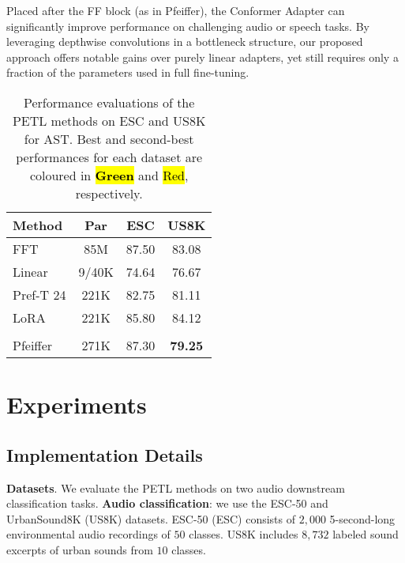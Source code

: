 \documentclass[11pt]{article}
\begin{document}
Placed after the FF block (as in Pfeiffer), the Conformer Adapter can significantly improve performance on challenging audio or speech tasks. By leveraging depthwise convolutions in a bottleneck structure, our proposed approach offers notable gains over purely linear adapters, yet still requires only a fraction of the parameters used in full fine-tuning.


\begingroup
\setlength{\tabcolsep}{3.3pt}

\begin{table}[t]
\centering
\caption{Performance evaluations of the PETL methods on ESC and US8K for AST. 
Best and second-best performances for each dataset are coloured in 
\hl{\textbf{Green}} and 
\hl{Red}, respectively.}
\label{tab:main}
\begin{tabular}{lKKK}
\toprule
\textbf{Method} & \textbf{Par} & \textbf{ESC} & \textbf{US8K}\\
\midrule
FFT &  85M & 87.50 & 83.08\\
Linear     & 9/40K   & 74.64      & 76.67\\
\hline \addlinespace
Pref-T 24  & 221K    & 82.75      & 81.11\\ 
LoRA       & 221K    & 85.80      & 84.12\\
\hline
{}
\\
\hline \addlinespace
Pfeiffer   & 271K    & 87.30 & \textbf{79.25}\\
\bottomrule
\end{tabular}
\end{table}
\endgroup


\section{Experiments}
\subsection{ Implementation Details}
\textbf{Datasets}. We evaluate the PETL methods on two audio downstream classification tasks.  \textbf{Audio classification}: we use the ESC-50 and UrbanSound8K (US8K) datasets. ESC-50 (ESC) \cite{piczak2015esc} consists of $2,000$ 5-second-long environmental audio recordings of $50$ classes. US8K \cite{salamon2014dataset} includes $8,732$ labeled sound excerpts of urban sounds from $10$ classes.
\end{document}
